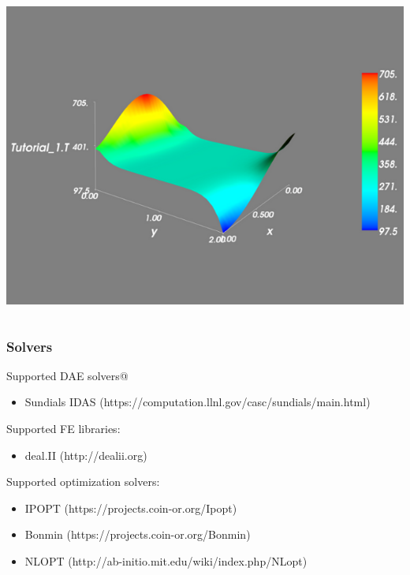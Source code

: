 \documentclass[compress,newPxFont,sthlmFooter]{beamer}
\begin{document}
\begin{frame}
\begin{columns}
\begin{column}{0.5\paperwidth}
    \begin{center}
      \includegraphics[width=0.3\paperwidth]{../_static/sample_3d_plot.png}
    \end{center}
  \end{column}
\end{columns}
\end{frame}

\begin{frame}
\frametitle{Solvers}
\begin{block}{}
Supported DAE solvers@
\begin{itemize}
  \item Sundials IDAS ({\small https://computation.llnl.gov/casc/sundials/main.html})
\end{itemize}
\end{block}

\begin{block}{}
Supported FE libraries:
\begin{itemize}
  \item deal.II ({\small http://dealii.org})
\end{itemize}
\end{block}

\begin{block}{}
Supported optimization solvers:
\begin{itemize}
  \item IPOPT ({\small https://projects.coin-or.org/Ipopt}) 
  \item Bonmin ({\small https://projects.coin-or.org/Bonmin}) 
  \item NLOPT ({\small http://ab-initio.mit.edu/wiki/index.php/NLopt}) 
\end{itemize}
\end{block}
\end{frame}
\end{document}
